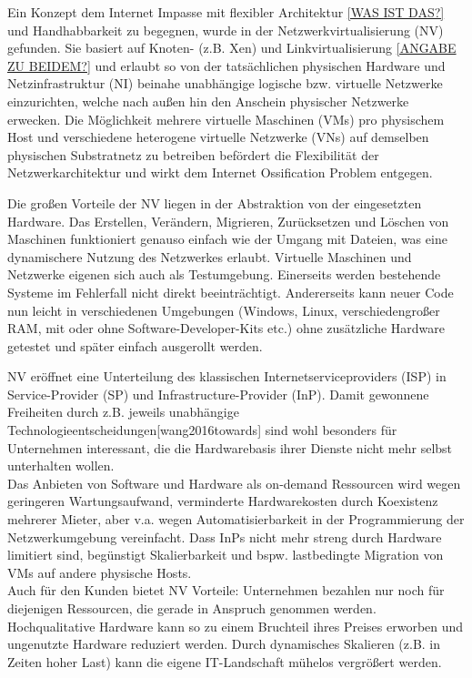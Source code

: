 Ein Konzept dem Internet Impasse mit flexibler Architektur \underline{[WAS IST DAS?]} und Handhabbarkeit zu begegnen, wurde in der Netzwerkvirtualisierung (NV) gefunden. \cite{anderson2005overcoming, bays2012security, fischer2013virtual} Sie basiert auf Knoten- (z.B. Xen) und Linkvirtualisierung \underline{[ANGABE ZU BEIDEM?]} und erlaubt so von der tatsächlichen physischen Hardware und Netzinfrastruktur (NI) beinahe unabhängige logische bzw. virtuelle Netzwerke einzurichten, welche nach außen hin den Anschein physischer Netzwerke erwecken. Die Möglichkeit mehrere virtuelle Maschinen (VMs) pro physischem Host und verschiedene heterogene virtuelle Netzwerke (VNs) auf demselben physischen Substratnetz zu betreiben befördert die Flexibilität der Netzwerkarchitektur und wirkt dem Internet Ossification Problem \cite{anderson2005overcoming} entgegen.

Die großen Vorteile der NV liegen in der Abstraktion von der eingesetzten Hardware. Das Erstellen, Verändern, Migrieren, Zurücksetzen und Löschen von Maschinen funktioniert genauso einfach wie der Umgang mit Dateien, was eine dynamischere Nutzung des Netzwerkes erlaubt. Virtuelle Maschinen und Netzwerke eigenen sich auch als Testumgebung. Einerseits werden bestehende Systeme im Fehlerfall nicht direkt beeinträchtigt. Andererseits kann neuer Code nun leicht in verschiedenen Umgebungen (Windows, Linux, verschiedengroßer RAM, mit oder ohne Software-Developer-Kits etc.) ohne zusätzliche Hardware getestet und später einfach ausgerollt werden.

NV eröffnet eine Unterteilung des klassischen Internetserviceproviders (ISP) in Service-Provider (SP) und Infrastructure-Provider (InP). Damit gewonnene Freiheiten durch z.B. jeweils unabhängige Technologieentscheidungen[wang2016towards] sind wohl besonders für Unternehmen interessant, die die Hardwarebasis ihrer Dienste nicht mehr selbst unterhalten wollen.\\
Das Anbieten von Software und Hardware als on-demand Ressourcen wird wegen geringeren Wartungsaufwand, verminderte Hardwarekosten durch Koexistenz mehrerer Mieter, aber v.a. wegen Automatisierbarkeit in der Programmierung der Netzwerkumgebung vereinfacht. Dass InPs nicht mehr streng durch Hardware limitiert sind, begünstigt Skalierbarkeit und bspw. lastbedingte Migration von VMs auf andere physische Hosts.\\
Auch für den Kunden bietet NV Vorteile: Unternehmen bezahlen nur noch für diejenigen Ressourcen, die gerade in Anspruch genommen werden. Hochqualitative Hardware kann so zu einem Bruchteil ihres Preises erworben und ungenutzte Hardware reduziert werden. Durch dynamisches Skalieren (z.B. in Zeiten hoher Last) kann die eigene IT-Landschaft mühelos vergrößert werden.


